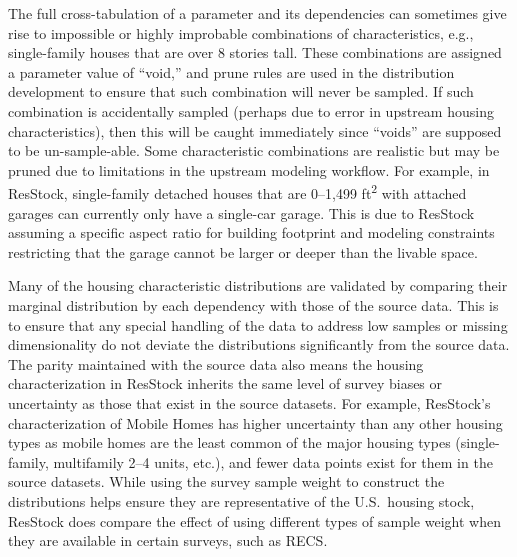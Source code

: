 The full cross-tabulation of a parameter and its dependencies can sometimes give rise to impossible or highly improbable combinations of characteristics, e.g., single-family houses that are over 8 stories tall. These combinations are assigned a parameter value of “void,” and prune rules are used in the distribution development to ensure that such combination will never be sampled. If such combination is accidentally sampled (perhaps due to error in upstream housing characteristics), then this will be caught immediately since ``voids'' are supposed to be un-sample-able. Some characteristic combinations are realistic but may be pruned due to limitations in the upstream modeling workflow. For example, in ResStock, single-family detached houses that are 0--1,499 ft\textsuperscript{2} with attached garages can currently only have a single-car garage. This is due to ResStock assuming a specific aspect ratio for building footprint and modeling constraints restricting that the garage cannot be larger or deeper than the livable space.

Many of the housing characteristic distributions are validated by comparing their marginal distribution by each dependency with those of the source data. This is to ensure that any special handling of the data to address low samples or missing dimensionality do not deviate the distributions significantly from the source data. The parity maintained with the source data also means the housing characterization in ResStock inherits the same level of survey biases or uncertainty as those that exist in the source datasets. For example, ResStock’s characterization of Mobile Homes has higher uncertainty than any other housing types as mobile homes are the least common of the major housing types (single-family, multifamily 2--4 units, etc.), and fewer data points exist for them in the source datasets. While using the survey sample weight to construct the distributions helps ensure they are representative of the U.S.~housing stock, ResStock does compare the effect of using different types of sample weight when they are available in certain surveys, such as RECS.




